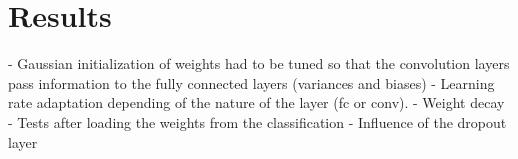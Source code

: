 \section{Results}





- Gaussian initialization of weights had to be tuned so that the convolution layers pass information to the fully connected layers (variances and biases)
- Learning rate adaptation depending of the nature of the layer (fc or conv).
- Weight decay
- Tests after loading the weights from the classification
- Influence of the dropout layer
